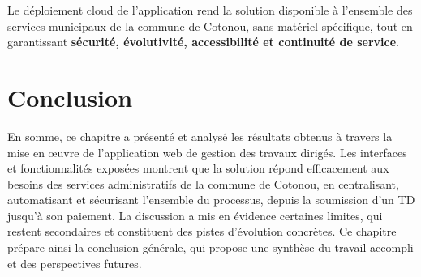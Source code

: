 Le déploiement cloud de l'application rend la solution disponible
à l'ensemble des services municipaux de la commune de Cotonou, sans
matériel spécifique, tout en garantissant
\textbf{sécurité, évolutivité, accessibilité et continuité de service}.

\section*{Conclusion}

En somme, ce chapitre a présenté et analysé les résultats obtenus
à travers la mise en œuvre de l'application web de gestion des
travaux dirigés. Les interfaces et fonctionnalités exposées montrent
que la solution répond efficacement aux besoins des services
administratifs de la commune de Cotonou, en centralisant, automatisant
et sécurisant l'ensemble du processus, depuis la soumission d'un TD
jusqu'à son paiement. La discussion a mis en évidence certaines limites,
qui restent secondaires et constituent des pistes d'évolution concrètes.
Ce chapitre prépare ainsi la conclusion générale, qui propose une
synthèse du travail accompli et des perspectives futures.